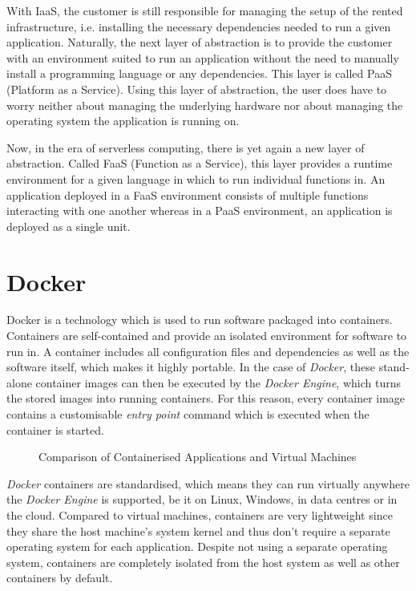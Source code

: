 With IaaS, the customer is still responsible for managing the setup of the rented infrastructure,
i.e. installing the necessary dependencies needed to run a given application. Naturally, the next
layer of abstraction is to provide the customer with an environment suited to run an application
without the need to manually install a programming language or any dependencies. This layer is
called PaaS (Platform as a Service). Using this layer of abstraction, the user does have to worry
neither about managing the underlying hardware nor about managing the operating system the
application is running on.

Now, in the era of serverless computing, there is yet again a new layer of abstraction. Called FaaS
(Function as a Service), this layer provides a runtime environment for a given language in which to
run individual functions in. An application deployed in a FaaS environment consists of multiple
functions interacting with one another whereas in a PaaS environment, an application is deployed as
a single unit.

\section{Docker}

Docker is a technology which is used to run software packaged into containers. Containers are
self-contained and provide an isolated environment for software to run in. A container includes all
configuration files and dependencies as well as the software itself, which makes it highly portable.
In the case of \textit{Docker}, these stand-alone container images can then be executed by the
\textit{Docker Engine}, which turns the stored images into running containers. For this reason,
every container image contains a customisable \textit{entry point} command which is executed when
the container is started.

\begin{figure}[H]
  \centering
  \caption{Comparison of Containerised Applications and Virtual Machines \cite{docker-container}}
\end{figure}

\textit{Docker} containers are standardised, which means they can run virtually anywhere the
\textit{Docker Engine} is supported, be it on Linux, Windows, in data centres or in the cloud.
Compared to virtual machines, containers are very lightweight since they share the host machine's
system kernel and thus don't require a separate operating system for each application. Despite not
using a separate operating system, containers are completely isolated from the host system as well
as other containers by default.

